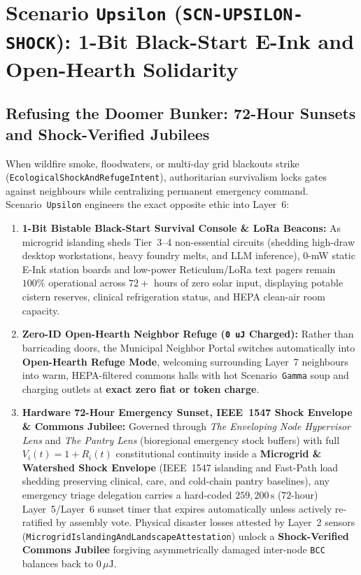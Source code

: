 \section{Scenario \texttt{Upsilon} (\texttt{SCN-UPSILON-SHOCK}): 1-Bit Black-Start E-Ink and Open-Hearth Solidarity}
\label{sec:wave-f-upsilon}

\subsection{Refusing the Doomer Bunker: 72-Hour Sunsets and Shock-Verified Jubilees}

When wildfire smoke, floodwaters, or multi-day grid blackouts strike (\texttt{EcologicalShockAndRefugeIntent}), authoritarian survivalism locks gates against neighbours while centralizing permanent emergency command. Scenario~\texttt{Upsilon} engineers the exact opposite ethic into Layer~6:
\begin{enumerate}
    \item \textbf{1-Bit Bistable Black-Start Survival Console \& LoRa Beacons:} As microgrid islanding sheds Tier~3--4 non-essential circuits (shedding high-draw desktop workstations, heavy foundry melts, and LLM inference), 0-mW static E-Ink station boards and low-power Reticulum/LoRa text pagers remain $100\%$ operational across $72+$ hours of zero solar input, displaying potable cistern reserves, clinical refrigeration status, and HEPA clean-air room capacity.
    \item \textbf{Zero-ID Open-Hearth Neighbor Refuge (\texttt{0 uJ} Charged):} Rather than barricading doors, the Municipal Neighbor Portal switches automatically into \textbf{Open-Hearth Refuge Mode}, welcoming surrounding Layer~7 neighbours into warm, HEPA-filtered commons halls with hot Scenario~\texttt{Gamma} soup and charging outlets at \textbf{exact zero fiat or token charge}.
    \item \textbf{Hardware 72-Hour Emergency Sunset, IEEE~1547 Shock Envelope \& Commons Jubilee:} Governed through \textit{The Enveloping Node Hypervisor Lens} and \textit{The Pantry Lens} (bioregional emergency stock buffers) with full $V_i(t) = 1 + R_i(t)$ constitutional continuity inside a \textbf{Microgrid \& Watershed Shock Envelope} (IEEE~1547 islanding and Fast-Path load shedding preserving clinical, care, and cold-chain pantry baselines), any emergency triage delegation carries a hard-coded $259{,}200\,\mathrm{s}$ ($72$-hour) Layer~5/Layer~6 sunset timer that expires automatically unless actively re-ratified by assembly vote. Physical disaster losses attested by Layer~2 sensors (\texttt{MicrogridIslandingAndLandscapeAttestation}) unlock a \textbf{Shock-Verified Commons Jubilee} forgiving asymmetrically damaged inter-node \texttt{BCC} balances back to $0\,\mu\mathrm{J}$.
\end{enumerate}


